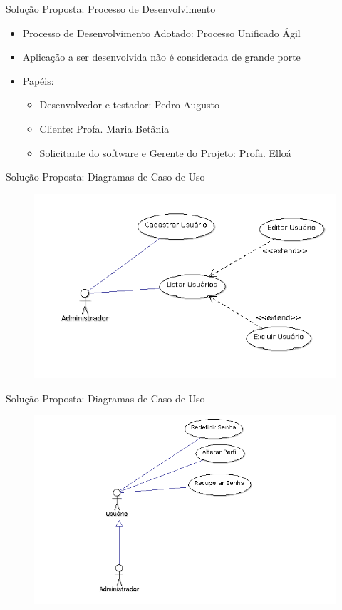 \begin{frame}{Solução Proposta: Processo de Desenvolvimento}
\begin{itemize}
	\item Processo de Desenvolvimento Adotado: \alert{Processo Unificado Ágil}
	\ \ \newline
	\item Aplicação a ser desenvolvida não é considerada de grande porte
	\ \ \newline
	\item Papéis:
	\begin{itemize}
		\item Desenvolvedor e testador: Pedro Augusto
		\item Cliente: Profa. Maria Betânia
		\item Solicitante do software e Gerente do Projeto: Profa. Elloá
	\end{itemize}
\end{itemize}
\end{frame}

\begin{frame}{Solução Proposta: Diagramas de Caso de Uso}
\begin{figure}[h!]
\centering
\includegraphics[width=0.8\linewidth]{./img/uc001}
\end{figure}
\end{frame}

\begin{frame}{Solução Proposta: Diagramas de Caso de Uso}
\begin{figure}[h!]
\centering
\includegraphics[width=0.7\linewidth]{./img/uc002}%
\end{figure}
\end{frame}

